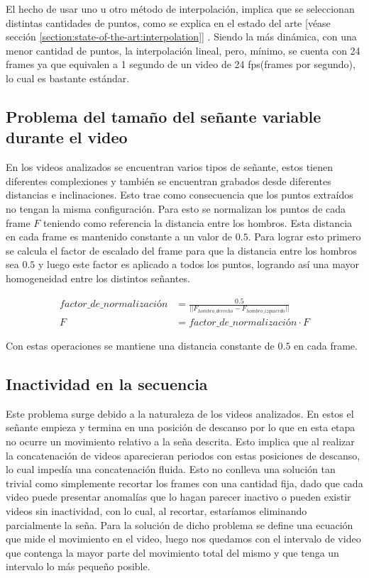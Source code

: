 El hecho de usar uno u otro método de interpolación, implica que se seleccionan distintas cantidades de puntos, como se explica en el estado del arte [véase sección \ref{section:state-of-the-art:interpolation}] . Siendo la más dinámica, con una menor cantidad de puntos, la interpolación lineal, pero, mínimo, se cuenta con 24 frames ya que equivalen a 1 segundo de un video de 24 fps(frames por segundo), lo cual es bastante estándar.


\subsection{Problema del tamaño del señante variable durante el video}

En los videos analizados se encuentran varios tipos de señante, estos tienen diferentes complexiones y también
se encuentran grabados desde diferentes distancias e inclinaciones. Esto trae como consecuencia que los puntos 
extraídos no tengan la misma configuración. Para esto se normalizan los puntos de cada frame $F$ teniendo como 
referencia la distancia entre los hombros. Esta distancia en cada frame es mantenido constante a un valor de $0.5$. Para lograr esto 
primero se calcula el factor de escalado del frame para que la distancia entre los hombros sea $0.5$ y luego este 
factor es aplicado a todos los puntos, logrando así una mayor homogeneidad entre los distintos señantes.

\begin{align}
factor\_de\_normalización &= \frac{0.5}{|| F_{hombro\_derecho} - F_{hombro\_izquierdo} ||} \\
F &= factor\_de\_normalización \cdot F
\end{align}

Con estas operaciones se mantiene una distancia constante de $0.5$ en cada frame.


\subsection{Inactividad en la secuencia}
Este problema surge debido a la naturaleza de los videos analizados. En estos el señante empieza y termina en una 
posición de descanso por lo que en esta etapa no ocurre un movimiento relativo a la seña descrita. Esto implica 
que al realizar la concatenación de videos aparecieran periodos con estas posiciones de descanso, lo cual impedía
una concatenación fluida. Esto no conlleva una solución tan trivial como simplemente recortar los frames con una cantidad fija, dado que cada video puede presentar anomalías que lo hagan parecer inactivo o pueden existir videos sin inactividad, con lo cual, al recortar, estaríamos eliminando parcialmente la seña. Para la solución de dicho problema se define una ecuación que mide el movimiento
en el video, luego nos quedamos con el intervalo de video que contenga la mayor parte del movimiento 
total del mismo y que tenga un intervalo lo más pequeño posible.

